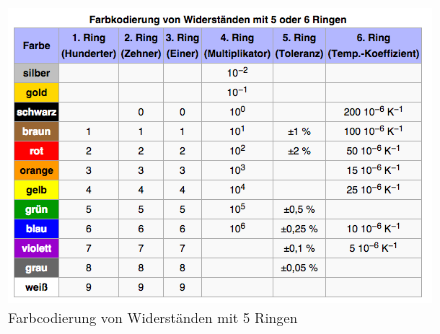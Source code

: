 \begin{frame}
  \begin{center}
    \begin{figure}
      \includegraphics[width=\textwidth,height=.9\textheight,keepaspectratio]{e04/5-Ringe.png}
      \caption{Farbcodierung von Widerständen mit 5 Ringen \cite{ringe5}}
      \label{fig_ringe5}
    \end{figure}
  \end{center}
\end{frame}

